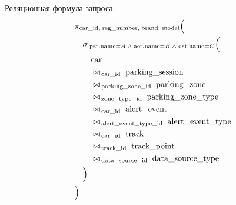 \noindent Реляционная формула запроса:
\[
\begin{aligned}
&\pi_{
  \text{car\_id},\;
  \text{reg\_number},\;
  \text{brand},\;
  \text{model}
}\Bigl( \\
&\quad\sigma_{
  \;\text{pzt.name}=A
  \;\wedge\;
  \text{aet.name}=B
  \;\wedge\;
  \text{dst.name}=C
}\Bigl( \\
&\qquad\text{car} \\
&\qquad\bowtie_{\,\text{car\_id}}\;\text{parking\_session} \\
&\qquad\bowtie_{\,\text{parking\_zone\_id}}\;\text{parking\_zone} \\
&\qquad\bowtie_{\,\text{zone\_type\_id}}\;\text{parking\_zone\_type} \\
&\qquad\bowtie_{\,\text{car\_id}}\;\text{alert\_event} \\
&\qquad\bowtie_{\,\text{alert\_event\_type\_id}}\;\text{alert\_event\_type} \\
&\qquad\bowtie_{\,\text{car\_id}}\;\text{track} \\
&\qquad\bowtie_{\,\text{track\_id}}\;\text{track\_point} \\
&\qquad\bowtie_{\,\text{data\_source\_id}}\;\text{data\_source\_type} \\
&\quad\Bigr) \\
&\Bigr)
\end{aligned}
\]

